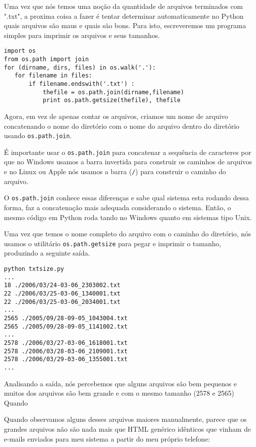\documentclass{book}
\begin{document}
Uma vez que nós temos uma noção da quantidade de arquivos terminados com ".txt", a proxima coisa a fazer é tentar determinar  automaticamente no Python quais arquivos são maus e quais são bons. Para isto, escreveremos um programa simples para imprimir os arquivos e seus tamanhos.

\begin{verbatim}
import os
from os.path import join
for (dirname, dirs, files) in os.walk('.'):
   for filename in files:
       if filename.endswith('.txt') :
           thefile = os.path.join(dirname,filename)
           print os.path.getsize(thefile), thefile
\end{verbatim}
%

Agora, em vez de apenas contar os arquivos, criamos um nome de arquivo concatenando o nome do diretório com
o nome do arquivo dentro do diretório usando {\tt os.path.join}.

É importante usar o {\tt os.path.join} para concatenar a sequência de caracteres por que no Windows usamos a
barra invertida para construir os caminhos de arquivos e no Linux ou Apple nós usamos a barra (\verb"/") para construir o 
caminho do arquivo.

O {\tt os.path.join} conhece essas diferenças e sabe qual sistema esta rodando dessa forma, faz a concatenação mais adequada considerando o sistema. Então, o mesmo código em Python roda tando no Windows quanto em sistemas tipo Unix.

Uma vez que temos o nome completo do arquivo com o caminho do diretório, nós usamos o utilitário {\tt os.path.getsize} para pegar
e imprimir o tamanho, produzindo a seguinte saída.  

\begin{verbatim}
python txtsize.py
...
18 ./2006/03/24-03-06_2303002.txt
22 ./2006/03/25-03-06_1340001.txt
22 ./2006/03/25-03-06_2034001.txt
...
2565 ./2005/09/28-09-05_1043004.txt
2565 ./2005/09/28-09-05_1141002.txt
...
2578 ./2006/03/27-03-06_1618001.txt
2578 ./2006/03/28-03-06_2109001.txt
2578 ./2006/03/29-03-06_1355001.txt
...
\end{verbatim}

Analisando a saída, nós percebemos que alguns arquivos são bem pequenos e muitos dos arquivos são bem grande e com o mesmo tamanho (2578 e 2565)
Quando 

%

Quando observamos alguns desses arquivos maiores manualmente, parece que os grandes arquivos não são nada mais que HTML genérico idênticos que vinham de e-mails enviados para meu sistema a partir do meu próprio telefone:
\end{document}
